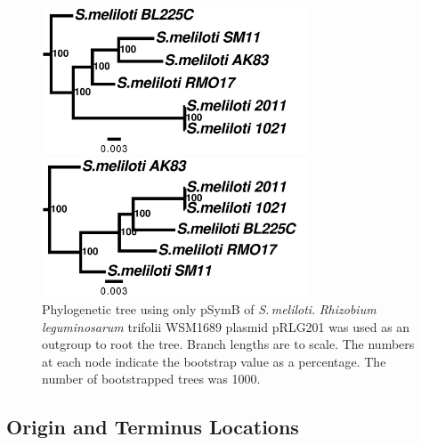 \documentclass[11pt]{article}
\newcommand{\smel}{\textit{S.\,meliloti}\xspace}
\newcommand{\rleg}{\textit{Rhizobium leguminosarum}\xspace}
\providecommand{\DIFaddbegin}{} %
\providecommand{\DIFaddend}{} %
\begin{document}
\begin{figure}
	\begin{center}
		\includegraphics[width=0.7\textwidth]{./figs/pSymA_chrom_figtree_raw_29Aug20.pdf}
		\caption{\label{fig:sinoPAtree} Phylogenetic tree using only pSymA of \smel. \rleg trifolii WSM1689 plasmid pRLG202 was used as an outgroup to root the tree. Branch lengths are to scale. The numbers at each node indicate the bootstrap value as a percentage. The number of bootstrapped trees was 1000.}
	\end{center}
	\vspace*{\floatsep}%
	\begin{center}

		\includegraphics[width=0.7\textwidth]{./figs/pSymB_chrom_figtree_raw_29Aug20.pdf}
		\caption{\label{fig:sinoPBtree} Phylogenetic tree using only pSymB of \smel. \rleg trifolii WSM1689 plasmid pRLG201 was used as an outgroup to root the tree. Branch lengths are to scale. The numbers at each node indicate the bootstrap value as a percentage. The number of bootstrapped trees was 1000.}
	\end{center}
\end{figure}
\DIFaddbegin \newpage
\DIFaddend 





	\subsection{Origin and Terminus Locations}
\end{document}

